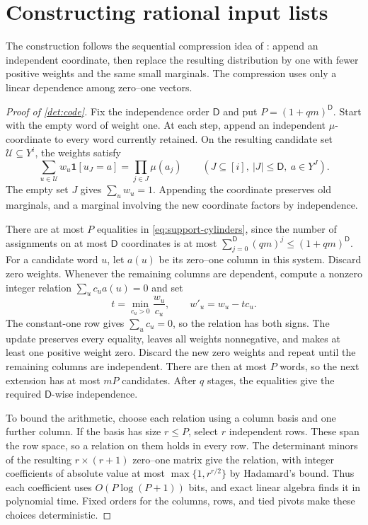 \documentclass[11pt]{article} \usepackage[utf8]{inputenc}
\theoremstyle{plain} \newtheorem{theorem}{Theorem}[section]
\theoremstyle{definition} \newaliascnt{definition}{theorem}
\newcommand{\ind}{\mathbf{1}}
\begin{document}
\section{Constructing rational input lists}
\label{sec:support-algorithm}

The construction follows the sequential compression idea of
\citet{koller1994sample}: append an independent coordinate, then replace the
resulting distribution by one with fewer positive weights and the same
small marginals. The compression uses only a linear dependence among
zero--one vectors.

\begin{proof}[Proof of \cref{det:code}]
Fix the independence order $\mathsf D$ and put $P=(1+qm)^{\mathsf D}$. Start
with the empty word of weight one. At each step, append an independent
$\mu$-coordinate to every word currently retained. On the resulting candidate
set $\mathcal U\subseteq Y^i$, the weights satisfy
\[
\sum_{u\in\mathcal U}w_u\ind[u_J=a]
=\prod_{j\in J}\mu(a_j)
\qquad
(J\subseteq[i],\ |J|\le\mathsf D,\ a\in Y^J).
\tag{*}\label{eq:support-cylinders}
\]
The empty set $J$ gives $\sum_uw_u=1$. Appending the coordinate preserves old
marginals, and a marginal involving the new coordinate factors by independence.

There are at most $P$ equalities in \eqref{eq:support-cylinders}, since the
number of assignments on at most $\mathsf D$ coordinates is at most
$\sum_{j=0}^{\mathsf D}(qm)^j\le(1+qm)^{\mathsf D}$. For a candidate word $u$,
let $a(u)$ be its zero--one column in this system. Discard zero weights.
Whenever the remaining columns are dependent, compute a nonzero integer
relation $\sum_uc_ua(u)=0$ and set
\[
t=\min_{c_u>0}\frac{w_u}{c_u},
\qquad
w'_u=w_u-tc_u.
\]
The constant-one row gives $\sum_uc_u=0$, so the relation has both signs.
The update preserves every equality, leaves all weights nonnegative, and
makes at least one positive weight zero. Discard the new zero weights and
repeat until the remaining columns are independent. There are then at most
$P$ words, so the next extension
has at most $mP$ candidates. After $q$ stages, the equalities give the required
$\mathsf D$-wise independence.

To bound the arithmetic, choose each relation using a column basis and one
further column. If the basis has size $r\le P$, select $r$ independent rows.
These span the row space, so a relation on them holds in every row.
The determinant minors of the resulting $r\times(r+1)$ zero--one matrix give
the relation, with integer coefficients of absolute value at most
$\max\{1,r^{r/2}\}$ by Hadamard's bound. Thus each coefficient uses
$O(P\log(P+1))$ bits, and exact linear algebra finds it in polynomial time.
Fixed orders for the columns, rows, and tied pivots make these choices
deterministic.


\end{proof}
\end{document}
